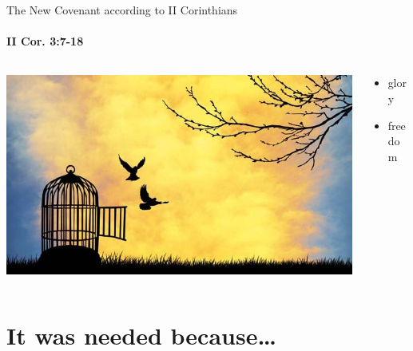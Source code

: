 \begin{frame}{The New Covenant according to II Corinthians}
\framesubtitle{II Cor. 3:7-18}

\begin{columns}[c]
\begin{column}{0.6\textwidth}
	\includegraphics[width=\columnwidth]{figures/freedom.jpg}
\end{column}
\begin{column}{0.4\textwidth}
	\begin{itemize}
		\item glory
		\item freedom
	\end{itemize}
\end{column}
\end{columns}

\end{frame}
\section{It was needed because\ldots}

